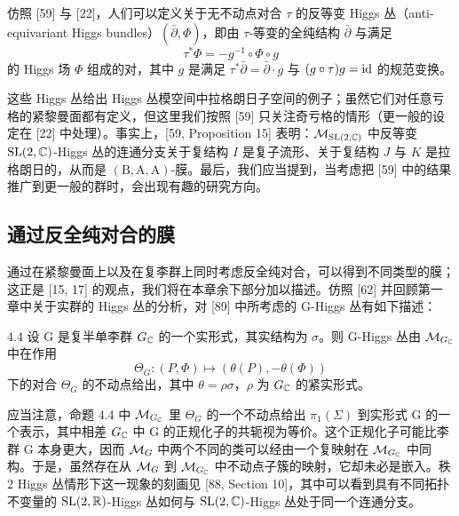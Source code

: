 
仿照 [59] 与 [22]，人们可以定义关于无不动点对合 $\tau$ 的反等变 Higgs 丛（anti-equivariant Higgs bundles）$(\bar\partial,\Phi)$，即由 $\tau$-等变的全纯结构 $\bar\partial$ 与满足
\[
\tau^*\Phi=-g^{-1}\circ\Phi\circ g
\]
的 Higgs 场 $\Phi$ 组成的对，其中 $g$ 是满足 $\tau^*\bar\partial=\bar\partial\cdot g$ 与 $(g\circ\tau)g=\mathrm{id}$ 的规范变换。

这些 Higgs 丛给出 Higgs 丛模空间中拉格朗日子空间的例子；虽然它们对任意亏格的紧黎曼面都有定义，但这里我们按照 [59] 只关注奇亏格的情形（更一般的设定在 [22] 中处理）。事实上，[59, Proposition 15] 表明：$\mathcal{M}_{\mathrm{SL}(2,\mathbb{C})}$ 中反等变 $\mathrm{SL}(2,\mathbb{C})$-Higgs 丛的连通分支关于复结构 $I$ 是复子流形、关于复结构 $J$ 与 $K$ 是拉格朗日的，从而是 $(\mathrm{B},\mathrm{A},\mathrm{A})$-膜。最后，我们应当提到，当考虑把 [59] 中的结果推广到更一般的群时，会出现有趣的研究方向。


\subsection{通过反全纯对合的膜}

通过在紧黎曼面上以及在复李群上同时考虑反全纯对合，可以得到不同类型的膜；这正是 [15, 17] 的观点，我们将在本章余下部分加以描述。仿照 [62] 并回顾第一章中关于实群的 Higgs 丛的分析，对 [89] 中所考虑的 G-Higgs 丛有如下描述：

\begin{prop}{4.4}
设 G 是复半单李群 $G_{\mathbb{C}}$ 的一个实形式，其实结构为 $\sigma$。则 G-Higgs 丛由 $\mathcal{M}_{G_{\mathbb{C}}}$ 中在作用
\[
\Theta_G\colon (P,\Phi)\mapsto(\theta(P),-\theta(\Phi))
\]
下的对合 $\Theta_G$ 的不动点给出，其中 $\theta=\rho\sigma$，$\rho$ 为 $G_{\mathbb{C}}$ 的紧实形式。
\end{prop}

应当注意，命题 4.4 中 $\mathcal{M}_{G_{\mathbb{C}}}$ 里 $\Theta_G$ 的一个不动点给出 $\pi_1(\Sigma)$ 到实形式 G 的一个表示，其中相差 $G_{\mathbb{C}}$ 中 G 的正规化子的共轭视为等价。这个正规化子可能比李群 G 本身更大，因而 $\mathcal{M}_G$ 中两个不同的类可以经由一个复映射在 $\mathcal{M}_{G_{\mathbb{C}}}$ 中同构。于是，虽然存在从 $\mathcal{M}_G$ 到 $\mathcal{M}_{G_{\mathbb{C}}}$ 中不动点子簇的映射，它却未必是嵌入。秩 2 Higgs 丛情形下这一现象的刻画见 [88, Section 10]，其中可以看到具有不同拓扑不变量的 $\mathrm{SL}(2,\mathbb{R})$-Higgs 丛如何与 $\mathrm{SL}(2,\mathbb{C})$-Higgs 丛处于同一个连通分支。

